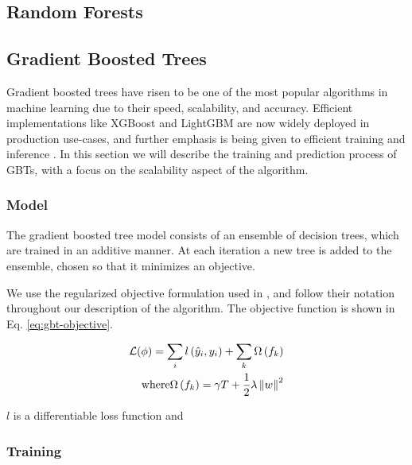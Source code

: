 \subsection{Random Forests}
\label{sec:bg-dt-random-forests}

\subsection{Gradient Boosted Trees}
\label{sec:bg-dt-gbts}

Gradient boosted trees have risen to be one of the most popular algorithms
in machine learning due to their speed, scalability, and accuracy. Efficient
implementations like XGBoost \cite{xgboost} and LightGBM \cite{lightgbm}
are now widely deployed in production use-cases, and further emphasis
is being given to efficient training \cite{dimboost} and inference \cite{quickscorer}.
In this section we will describe the training and prediction process of GBTs,
with a focus on the scalability aspect of the algorithm.

\subsubsection*{Model}

The gradient boosted tree model consists of an ensemble of decision trees,
which are trained in an additive manner. At each iteration a new tree is added
to the ensemble, chosen so that it minimizes an objective.


We use the
regularized objective formulation used
in \cite{xgboost}, and follow their notation throughout our description of the algorithm.
The objective function is shown in Eq. \ref{eq:gbt-objective}.

\begin{equation}
	\begin{split}
	\mathcal{L}(\phi) = \sum_{i} l\left(\hat{y}_{i},y_{i}\right) + \sum_{k} \Omega\left(f_{k}\right) \\
	\text{where} \Omega\left(f_{k}\right) = \gamma T + \frac{1}{2} \lambda \left\lVert w\right\rVert^2
	\end{split}
	\label{eq:gbt-objective}
\end{equation}

$l$ is a differentiable loss function and


\subsubsection*{Training}

